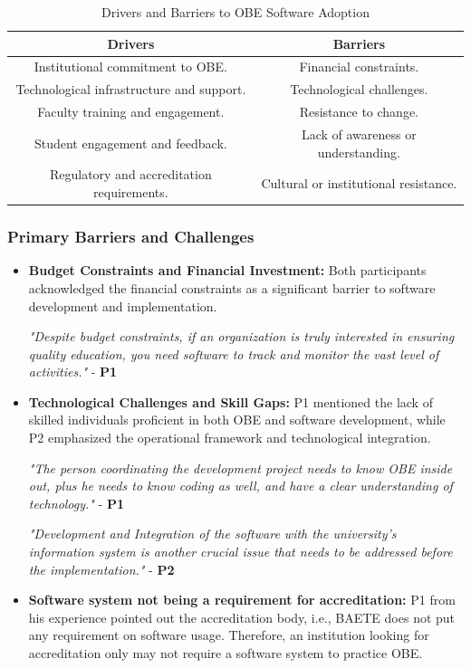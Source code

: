 \documentclass[journal,onecolumn]{IEEEtran}
\begin{document}
\begin{table}[ht]
\centering
\caption{Drivers and Barriers to OBE Software Adoption}
\label{tab:drivers_barriers}
\begin{tabular}{|c|c|}
\hline
\textbf{Drivers} & \textbf{Barriers} \\
\hline
Institutional commitment to OBE. & Financial constraints. \\
Technological infrastructure and support. & Technological challenges. \\
Faculty training and engagement. & Resistance to change. \\
Student engagement and feedback. & Lack of awareness or understanding. \\
Regulatory and accreditation requirements. & Cultural or institutional resistance. \\
\hline
\end{tabular}
\end{table}

\subsubsection{\textbf{Primary Barriers and Challenges}}

\begin{itemize}
    \item \textbf{Budget Constraints and Financial Investment:} Both participants acknowledged the financial constraints as a significant barrier to software development and implementation.

\textit{"Despite budget constraints, if an organization is truly interested in ensuring quality education, you need software to track and monitor the vast level of activities."} - \textbf{P1}

\item \textbf{Technological Challenges and Skill Gaps:} P1 mentioned the lack of skilled individuals proficient in both OBE and software development, while P2 emphasized the operational framework and technological integration.

\textit{"The person coordinating the development project needs to know OBE inside out, plus he needs to know coding as well, and have a clear understanding of technology."} - \textbf{P1}

\textit{"Development and Integration of the software with the university’s information system is another crucial issue that needs to be addressed before the implementation."} - \textbf{P2}

\item \textbf{Software system not being a requirement for accreditation: }P1 from his experience pointed out the accreditation body, i.e., BAETE does not put any requirement on software usage. Therefore, an institution looking for accreditation only may not require a software system to practice OBE. 

\end{itemize}
\end{document}
